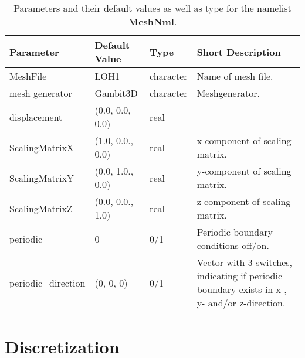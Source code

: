 \documentclass[12pt,twoside]{article}
\begin{document}
\begin{table}[H]
\caption{Parameters and their default values as well as type for the namelist \textbf{MeshNml}.}
\begin{center}
\begin{tabular}{|p{4cm}|p{2.7cm}|p{2cm}|p{4cm}|}
\hline
Parameter & Default Value & Type & Short Description \\
\hline
\hline
 MeshFile & LOH1 & character & Name of mesh file.\\
mesh generator & Gambit3D & character & Meshgenerator. \\
displacement & (0.0, 0.0, 0.0) & real & \\
ScalingMatrixX & (1.0, 0.0., 0.0) & real & x-component of scaling matrix. \\
ScalingMatrixY & (0.0, 1.0., 0.0) & real & y-component of scaling matrix. \\
ScalingMatrixZ & (0.0, 0.0., 1.0) & real & z-component of scaling matrix. \\
periodic & 0 & 0/1 & Periodic boundary conditions off/on.\\
periodic\_direction & (0, 0, 0) & 0/1 & Vector with 3 switches, indicating if periodic boundary exists in x-, y- and/or z-direction.\\
\hline
\end{tabular}
\end{center}
\label{mesh-table}
\end{table}

\newpage

\section{Discretization}
\label{sec-block-dis}
\end{document}
